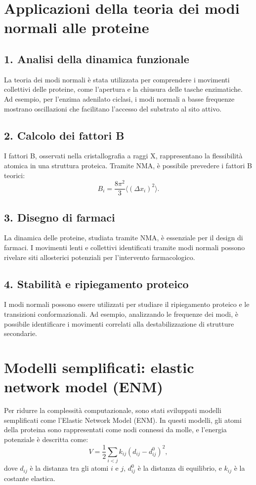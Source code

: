 \documentclass[Lau,binding=0.6cm,oneside,noexaminfo]{sapthesis}
\begin{document}
\section{Applicazioni della teoria dei modi normali alle proteine}

\subsection*{1. Analisi della dinamica funzionale}
La teoria dei modi normali è stata utilizzata per comprendere i movimenti collettivi delle proteine, come l’apertura e la chiusura delle tasche enzimatiche. Ad esempio, per l'enzima adenilato ciclasi, i modi normali a basse frequenze mostrano oscillazioni che facilitano l'accesso del substrato al sito attivo.

\subsection*{2. Calcolo dei fattori B}
I fattori B, osservati nella cristallografia a raggi X, rappresentano la flessibilità atomica in una struttura proteica. Tramite NMA, è possibile prevedere i fattori B teorici:
\[
B_i = \frac{8 \pi^2}{3} \langle (\Delta x_i)^2 \rangle.
\]

\subsection*{3. Disegno di farmaci}
La dinamica delle proteine, studiata tramite NMA, è essenziale per il design di farmaci. I movimenti lenti e collettivi identificati tramite modi normali possono rivelare siti allosterici potenziali per l’intervento farmacologico.

\subsection*{4. Stabilità e ripiegamento proteico}
I modi normali possono essere utilizzati per studiare il ripiegamento proteico e le transizioni conformazionali. Ad esempio, analizzando le frequenze dei modi, è possibile identificare i movimenti correlati alla destabilizzazione di strutture secondarie.

\section{Modelli semplificati: elastic network model (ENM)}

Per ridurre la complessità computazionale, sono stati sviluppati modelli semplificati come l’Elastic Network Model (ENM). In questi modelli, gli atomi della proteina sono rappresentati come nodi connessi da molle, e l’energia potenziale è descritta come:
\[
V = \frac{1}{2} \sum_{i<j} k_{ij} (d_{ij} - d_{ij}^0)^2,
\]
dove $d_{ij}$ è la distanza tra gli atomi $i$ e $j$, $d_{ij}^0$ è la distanza di equilibrio, e $k_{ij}$ è la costante elastica.
\end{document}
